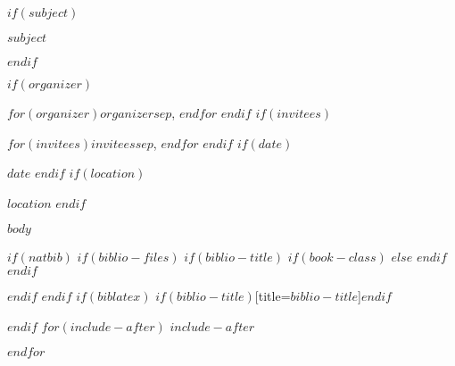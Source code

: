 \documentclass[$if(fontsize)$$fontsize$,$endif$$if(lang)$$lang$,$endif$$if(papersize)$$papersize$,$endif$$for(classoption)$$classoption$$sep$,$endfor$]{$documentclass$}
\begin{document}
$if(subject)$
\begin{center}
  \bfseries{\LARGE{$subject$}}
\end{center}
$endif$

\begin{description}[leftmargin=!,itemsep=3pt,labelwidth=\widthof{\textbf{ORGANIZER:}  }]
  $if(organizer)$
    \item[ORGANIZER:] $for(organizer)$$organizer$$sep$, $endfor$
  $endif$
  $if(invitees)$
    \item[INVITEES:] $for(invitees)$$invitees$$sep$, $endfor$
  $endif$
  $if(date)$
    \item[DATE:] $date$
  $endif$
  $if(location)$
    \item[LOCATION:] $location$
  $endif$
\end{description}
\vspace{-10pt}
\noindent\makebox[\linewidth]{\rule{\textwidth}{0.4pt}}

$body$

$if(natbib)$
$if(biblio-files)$
$if(biblio-title)$
$if(book-class)$
\renewcommand\bibname{$biblio-title$}
$else$
\renewcommand\refname{$biblio-title$}
$endif$
$endif$


$endif$
$endif$
$if(biblatex)$
\printbibliography$if(biblio-title)$[title=$biblio-title$]$endif$

$endif$
$for(include-after)$
$include-after$

$endfor$
\end{document}
